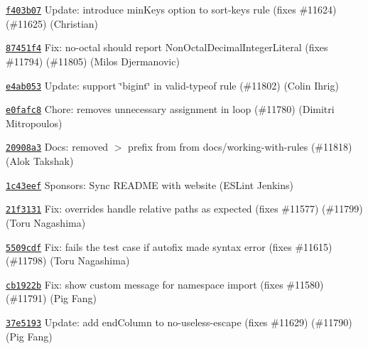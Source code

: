\begin{DoxyItemize}
\item \href{https://github.com/eslint/eslint/commit/f403b07283f91f1285d8318d6acea851dd765755}{\texttt{ {\ttfamily f403b07}}} Update\+: introduce min\+Keys option to sort-\/keys rule (fixes \#11624) (\#11625) (Christian)
\item \href{https://github.com/eslint/eslint/commit/87451f4779bc4c0ec874042b6854920f947ee258}{\texttt{ {\ttfamily 87451f4}}} Fix\+: no-\/octal should report Non\+Octal\+Decimal\+Integer\+Literal (fixes \#11794) (\#11805) (Milos Djermanovic)
\item \href{https://github.com/eslint/eslint/commit/e4ab0531c4e44c23494c6a802aa2329d15ac90e5}{\texttt{ {\ttfamily e4ab053}}} Update\+: support \char`\"{}bigint\char`\"{} in valid-\/typeof rule (\#11802) (Colin Ihrig)
\item \href{https://github.com/eslint/eslint/commit/e0fafc8ef59a80a6137f4170bbe46582d6fbcafc}{\texttt{ {\ttfamily e0fafc8}}} Chore\+: removes unnecessary assignment in loop (\#11780) (Dimitri Mitropoulos)
\item \href{https://github.com/eslint/eslint/commit/20908a38f489c285abf8fceef4d9d13bf8b87f22}{\texttt{ {\ttfamily 20908a3}}} Docs\+: removed \textquotesingle{}$>$\textquotesingle{} prefix from from docs/working-\/with-\/rules (\#11818) (Alok Takshak)
\item \href{https://github.com/eslint/eslint/commit/1c43eef605a9cf02a157881424ea62dcae747f69}{\texttt{ {\ttfamily 1c43eef}}} Sponsors\+: Sync R\+E\+A\+D\+ME with website (E\+S\+Lint Jenkins)
\item \href{https://github.com/eslint/eslint/commit/21f3131aa1636afa8e5c01053e0e870f968425b1}{\texttt{ {\ttfamily 21f3131}}} Fix\+: {\ttfamily overrides} handle relative paths as expected (fixes \#11577) (\#11799) (Toru Nagashima)
\item \href{https://github.com/eslint/eslint/commit/5509cdfa1b3d575248eef89a935f79c82e3f3071}{\texttt{ {\ttfamily 5509cdf}}} Fix\+: fails the test case if autofix made syntax error (fixes \#11615) (\#11798) (Toru Nagashima)
\item \href{https://github.com/eslint/eslint/commit/cb1922bdc07e58de0e55c13fd992dd8faf3292a4}{\texttt{ {\ttfamily cb1922b}}} Fix\+: show custom message for namespace import (fixes \#11580) (\#11791) (Pig Fang)
\item \href{https://github.com/eslint/eslint/commit/37e5193102d7544f155cdcb09c7c50dc602914d4}{\texttt{ {\ttfamily 37e5193}}} Update\+: add {\ttfamily end\+Column} to no-\/useless-\/escape (fixes \#11629) (\#11790) (Pig Fang)

\end{DoxyItemize}
